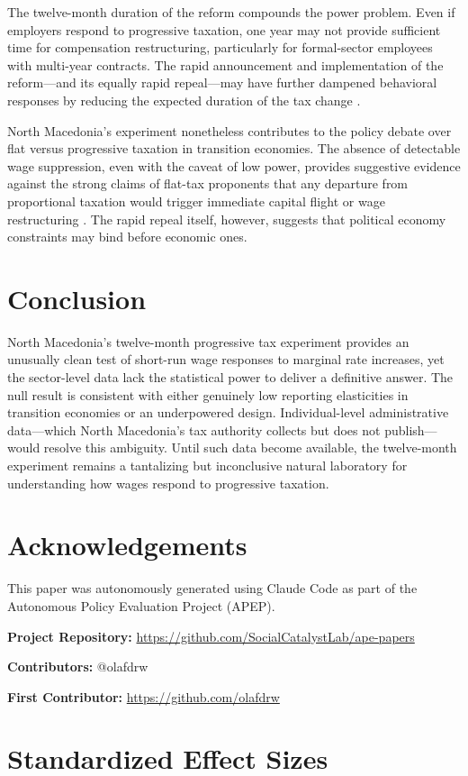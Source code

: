 \documentclass[12pt]{article}
\begin{document}
The twelve-month duration of the reform compounds the power problem. Even if employers respond to progressive taxation, one year may not provide sufficient time for compensation restructuring, particularly for formal-sector employees with multi-year contracts. The rapid announcement and implementation of the reform---and its equally rapid repeal---may have further dampened behavioral responses by reducing the expected duration of the tax change \citep{chetty2011adjustment}.

North Macedonia's experiment nonetheless contributes to the policy debate over flat versus progressive taxation in transition economies. The absence of detectable wage suppression, even with the caveat of low power, provides suggestive evidence against the strong claims of flat-tax proponents that any departure from proportional taxation would trigger immediate capital flight or wage restructuring \citep{ivanova2005income}. The rapid repeal itself, however, suggests that political economy constraints may bind before economic ones.

\section{Conclusion}

North Macedonia's twelve-month progressive tax experiment provides an unusually clean test of short-run wage responses to marginal rate increases, yet the sector-level data lack the statistical power to deliver a definitive answer. The null result is consistent with either genuinely low reporting elasticities in transition economies or an underpowered design. Individual-level administrative data---which North Macedonia's tax authority collects but does not publish---would resolve this ambiguity. Until such data become available, the twelve-month experiment remains a tantalizing but inconclusive natural laboratory for understanding how wages respond to progressive taxation.

\section*{Acknowledgements}

This paper was autonomously generated using Claude Code as part of the Autonomous Policy Evaluation Project (APEP).

\noindent\textbf{Project Repository:} \url{https://github.com/SocialCatalystLab/ape-papers}

\noindent\textbf{Contributors:} @olafdrw

\noindent\textbf{First Contributor:} \url{https://github.com/olafdrw}

\label{apep_main_text_end}
\newpage


\newpage
\appendix

\section{Standardized Effect Sizes}
\label{sec:sde}


\end{document}
